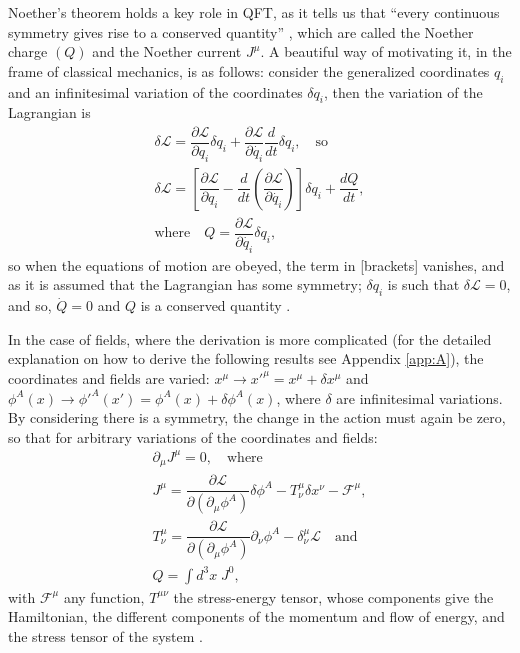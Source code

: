 Noether's theorem holds a key role in QFT, as it tells us that ``every continuous symmetry gives rise to a conserved quantity'' \cite{Tong}, which are called the Noether charge $(Q)$ and the Noether current $J^{\mu}$. A beautiful way of motivating it, in the frame of classical mechanics, is as follows: consider the generalized coordinates $q_i$ and an infinitesimal variation of the coordinates $\delta q_i$, then the variation of the Lagrangian is
\begin{gather*}
    \delta\mathcal{L} = \dfrac{\partial\mathcal{L}}{\partial q_i}\delta q_i + \dfrac{\partial\mathcal{L}}{\partial \dot{q_i}}\dfrac{d}{dt}\delta q_i, \quad \textrm{so} \\
    \delta\mathcal{L} = \left[\dfrac{\partial\mathcal{L}}{\partial q_i} - \dfrac{d}{dt}\left(\dfrac{\partial\mathcal{L}}{\partial \dot{q_i}}\right)\right]\delta q_i + \dfrac{dQ}{dt}, \\
    \textrm{where} \quad Q = \dfrac{\partial\mathcal{L}}{\partial \dot{q_i}}\delta q_i,
\end{gather*}
so when the equations of motion are obeyed, the term in [brackets] vanishes, and as it is assumed that the Lagrangian has some symmetry; $\delta q_i$ is such that $\delta \mathcal{L}=0$, and so, $\dot{Q} = 0$ and $Q$ is a conserved quantity \cite{Tong}.

In the case  of fields, where the derivation is more complicated (for the detailed explanation on how to derive the following results see Appendix \ref{app:A}), the coordinates and fields are varied: $x^{\mu}\rightarrow x'^{\mu} = x^{\mu} + \delta x^{\mu}$ and $\phi^A(x)\rightarrow \phi'^A(x') = \phi^A(x) + \delta\phi^A(x)$, where $\delta$ are infinitesimal variations. By considering there is a symmetry, the change in the action must again be zero,  so that for arbitrary variations of the coordinates and fields:
\begin{gather*}
    \partial_{\mu}J^{\mu} = 0, \quad \textrm{where} \\
    J^{\mu} = \dfrac{\partial\mathcal{L}}{\partial(\partial_{\mu}\phi^A)}\delta\phi^A - T^{\mu}_{\nu}\delta x^{\nu} - \mathcal{F}^{\mu}, \\
    T^{\mu}_{\nu} = \dfrac{\partial\mathcal{L}}{\partial(\partial_{\mu}\phi^A)}\partial_{\nu}\phi^A - \delta^{\mu}_{\nu}\mathcal{L} \quad \textrm {and} \\
    Q = \int d^3x \; J^0,
\end{gather*}
with $\mathcal{F}^{\mu}$ any function, $T^{\mu\nu}$ the stress-energy tensor, whose components give the Hamiltonian, the different components of the momentum and flow of energy, and the stress tensor of the system \cite{Goldberg}.

